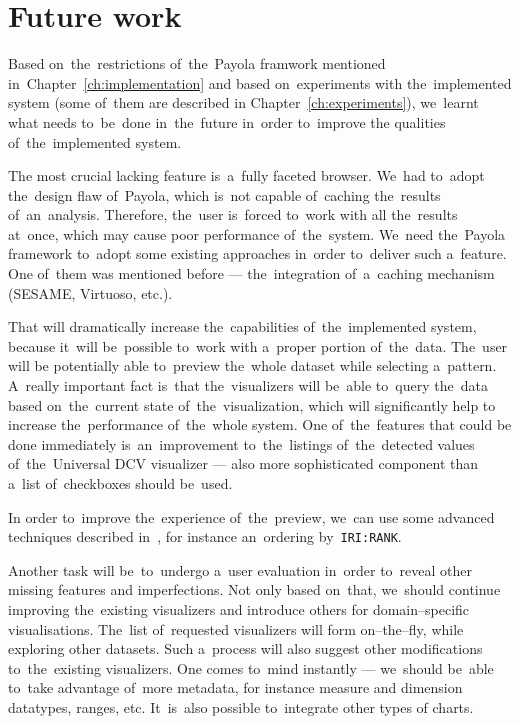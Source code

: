 \chapter{Future work}
\label{ch:future}

Based on~the~restrictions of~the~Payola framwork mentioned in~Chapter~\ref{ch:implementation}
and based on~experiments with the~implemented system (some of~them are described in
Chapter~\ref{ch:experiments}), we~learnt what needs to~be~done in~the~future in~order to~improve
the qualities of~the~implemented system.

The most crucial lacking feature is~a~fully faceted browser. We~had to~adopt the~design flaw of~Payola, which is~not capable of~caching the~results of~an~analysis. 
Therefore, the~user is~forced to~work with all the~results at~once, which may 
cause poor performance of~the~system. We~need the~Payola framework to~adopt some 
existing approaches in~order to~deliver such a~feature. One of~them was 
mentioned before --- the~integration of~a~caching mechanism (SESAME, Virtuoso, etc.).

That will dramatically increase the~capabilities of~the~implemented system, 
because it~will be~possible to~work with a~proper portion of~the~data. The~user will 
be potentially able to~preview the~whole dataset while selecting a~pattern. A~really important fact is~that the~visualizers will be~able to~query the~data 
based on~the~current state of~the~visualization, which will significantly help 
to increase the~performance of~the~whole system. One of~the~features that could 
be done immediately is~an~improvement to~the~listings of~the~detected values of~the~Universal DCV visualizer --- also more sophisticated component than a~list of~checkboxes should be~used.

In order to~improve the~experience of~the~preview, we~can use some advanced 
techniques described in~\cite{faceted-ldow2009}, for instance an~ordering by~\texttt{IRI:RANK}.

Another task will be~to~undergo a~user evaluation in~order to~reveal other 
missing features and imperfections. Not only based on~that, we~should continue 
improving the~existing visualizers and introduce others for
domain--specific visualisations. The~list of~requested visualizers will form 
on--the--fly, while exploring other datasets. Such a~process will also suggest 
other modifications to~the~existing visualizers. One comes to~mind instantly --- we~should be~able to~take advantage of~more metadata, for instance measure and 
dimension datatypes, ranges, etc. It~is~also possible to~integrate other types 
of charts.

